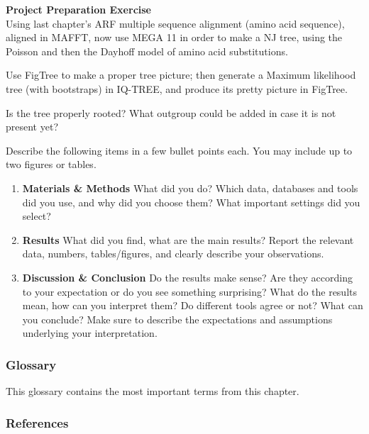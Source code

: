 \begin{framed}
\textbf{\textbf{Project Preparation Exercise}}\\
Using last chapter's ARF multiple sequence alignment (amino acid sequence),
aligned in MAFFT, now use MEGA 11 in order to make a NJ tree, using the
Poisson and then the Dayhoff model of amino acid substitutions.

Use FigTree to make a proper tree picture; then generate a Maximum likelihood
tree (with bootstraps) in IQ-TREE, and produce its pretty picture in FigTree.

Is the tree properly rooted? What outgroup could be added in case it is not
present yet?

Describe the following items in a few bullet points each.
You may include up to two figures or tables.

\begin{enumerate}
\item \textbf{Materials \& Methods} What did you do? Which data, databases and tools did you use, and why did you choose them? What important settings did you select?
\item \textbf{Results} What did you find, what are the main results? Report the relevant data, numbers, tables/figures, and clearly describe your observations.
\item \textbf{Discussion \& Conclusion} Do the results make sense? Are they according to your expectation or do you see something surprising? What do the results mean, how can you interpret them? Do different tools agree or not? What can you conclude? Make sure to describe the expectations and assumptions underlying your interpretation.
\end{enumerate}
\end{framed}

\subsubsection{Glossary}

This glossary contains the most important terms from this chapter.

\subsubsection{References}
